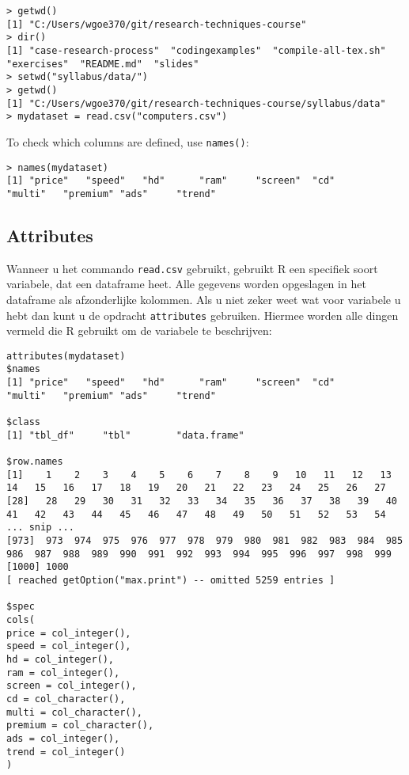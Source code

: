 \begin{lstlisting}
> getwd()
[1] "C:/Users/wgoe370/git/research-techniques-course"
> dir()
[1] "case-research-process"  "codingexamples"  "compile-all-tex.sh"  "exercises"  "README.md"  "slides"
> setwd("syllabus/data/")
> getwd()
[1] "C:/Users/wgoe370/git/research-techniques-course/syllabus/data"
> mydataset = read.csv("computers.csv")
\end{lstlisting}

To check which columns are defined, use \texttt{names()}:
\begin{lstlisting}
> names(mydataset)
[1] "price"   "speed"   "hd"      "ram"     "screen"  "cd"      "multi"   "premium" "ads"     "trend"
\end{lstlisting}

\subsection{Attributes}

Wanneer u het commando \texttt{read.csv} gebruikt, gebruikt R een specifiek soort variabele, dat een dataframe heet. Alle gegevens worden opgeslagen in het dataframe als afzonderlijke kolommen. Als u niet zeker weet wat voor variabele u hebt dan kunt u de opdracht \texttt{attributes} gebruiken. Hiermee worden alle dingen vermeld die R gebruikt om de variabele te beschrijven:

\begin{lstlisting}
attributes(mydataset)
$names
[1] "price"   "speed"   "hd"      "ram"     "screen"  "cd"      "multi"   "premium" "ads"     "trend"  

$class
[1] "tbl_df"     "tbl"        "data.frame"

$row.names
[1]    1    2    3    4    5    6    7    8    9   10   11   12   13   14   15   16   17   18   19   20   21   22   23   24   25   26   27
[28]   28   29   30   31   32   33   34   35   36   37   38   39   40   41   42   43   44   45   46   47   48   49   50   51   52   53   54
... snip ...
[973]  973  974  975  976  977  978  979  980  981  982  983  984  985  986  987  988  989  990  991  992  993  994  995  996  997  998  999
[1000] 1000
[ reached getOption("max.print") -- omitted 5259 entries ]

$spec
cols(
price = col_integer(),
speed = col_integer(),
hd = col_integer(),
ram = col_integer(),
screen = col_integer(),
cd = col_character(),
multi = col_character(),
premium = col_character(),
ads = col_integer(),
trend = col_integer()
)
\end{lstlisting}

